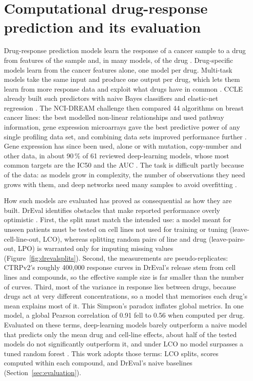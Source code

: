 \section{Computational drug-response prediction and its evaluation}
\label{sec:bg-prediction}

Drug-response prediction models learn the response of a cancer sample to a drug from features of the
sample and, in many models, of the drug \cite{partin2023}. Drug-specific models learn from the cancer
features alone, one model per drug. Multi-task models take the same input and produce one output per
drug, which lets them learn from more response data and exploit what drugs have in common
\cite{partin2023}. CCLE already built such predictors with naive Bayes classifiers and elastic-net
regression \cite{barretina2012}. The NCI-DREAM challenge then compared 44 algorithms on breast cancer
lines: the best modelled non-linear relationships and used pathway information, gene expression
microarrays gave the best predictive power of any single profiling data set, and combining data sets
improved performance further \cite{costello2014}. Gene expression has since been used, alone or with
mutation, copy-number and other data, in about 90\,\% of 61 reviewed deep-learning
models, whose most common targets are the IC50 and the AUC \cite{partin2023}. The task is difficult
partly because of the data: as models grow in complexity, the number of observations they need grows
with them, and deep networks need many samples to avoid overfitting \cite{adam2020}.

How such models are evaluated has proved as consequential as how they are built. DrEval identifies
obstacles that make reported performance overly optimistic \cite{dreval}. First, the split must match
the intended use: a model meant for unseen patients must be tested on cell lines not used for training
or tuning (leave-cell-line-out, LCO), whereas splitting random pairs of line and drug (leave-pairs-out, LPO) is warranted
only for imputing missing values (Figure~\ref{fig:drevalsplits}). Second, the measurements are pseudo-replicates: CTRPv2's roughly
400{,}000 response curves in DrEval's release stem from \NCtrpLines{} cell lines and \NDrugs{} compounds, so the effective
sample size is far smaller than the number of curves. Third, most of the variance in response lies
between drugs, because drugs act at very different concentrations, so a model that memorises each drug's
mean explains most of it. This Simpson's paradox inflates global metrics. In one model, a global
Pearson correlation of 0.91 fell to 0.56 when computed per drug. Evaluated on these terms, deep-learning
models barely outperform a naive model that predicts only the mean drug and cell-line effects, about half
of the tested models do not significantly outperform it, and under LCO no model surpasses a tuned random
forest \cite{dreval}. This work adopts those terms: LCO splits, scores computed within each compound, and
DrEval's naive baselines (Section~\ref{sec:evaluation}).

